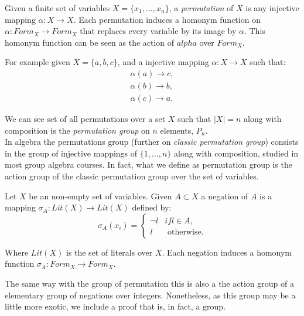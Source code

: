     
\begin{definition}[Permutation]
    Given a finite set of variables $X = \{x_1,...,x_n\}$, a \emph{permutation} of $X$ is any injective mapping $\alpha:X \to X$. Each permutation induces a homonym function on $\alpha: Form_X \to Form_X$  that replaces every variable by its image by $\alpha$. This homonym function can be seen as the action of $alpha$ over $Form_X$.
\end{definition}

      For example given $X = \{a,b,c\}$, and a injective mapping $\alpha:X\to X$ such that: 
  \begin{equation}
     \begin{split}
       \alpha(a) \to c,\\
       \alpha(b) \to b,\\
       \alpha(c) \to a.
     \end{split}
 \end{equation}

 We can see set of all permutations over a set $X$ such that $|X|=n$ along with composition is the \emph{permutation group} on $n$ elements, $P_n$.\\

 In algebra the permutations group (further on \emph{classic permutation group}) consists in the group of injective mappings of $\{1,...,n\}$ along with composition, studied in most group algebra courses. In fact, what we define as permutation group is the action group of the classic permutation group over the set of variables. 

\begin{definition}
  Let $X$ be an non-empty set of variables. Given $A\subset X$ a negation of $A$ is a mapping $\sigma_{A}:Lit(X) \to Lit(X)$ defined by:
  $$
\sigma_{A}(x_{i})=
\begin{cases}
  \neg l & if l \in A, \\
  l & \text{ otherwise}.
\end{cases}$$

Where $Lit(X)$ is the set of literals over $X$. Each negation induces a homonym function $\sigma_{A}:Form_{X}\to Form_{X}$.
\end{definition}
The same way with the group of permutation this is also a the action group of a elementary group of negations over integers. Nonetheless, as this group may be a little more exotic, we include a proof that  is, in fact, a group.

